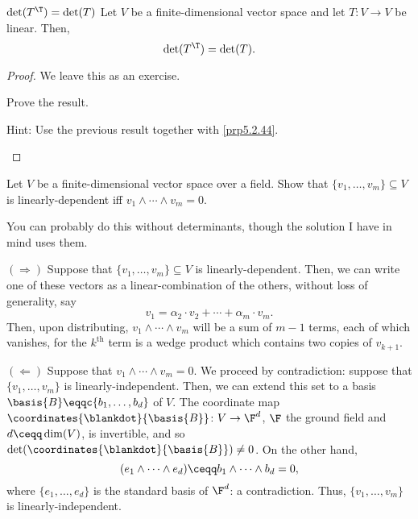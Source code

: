 \begin{crl}{$\det (T^{\T})=\det (T)$}{}
	Let $V$ be a finite-dimensional vector space and let $T\colon V\rightarrow V$ be linear.  Then,
	\begin{equation}
		\det (T^{\T})=\det (T).
	\end{equation}
	\begin{proof}
		We leave this as an exercise.
		\begin{exr}[breakable=false]{}{}
			Prove the result.
			\begin{rmk}
				Hint:  Use the previous result together with \cref{prp5.2.44}.
			\end{rmk}
		\end{exr}
	\end{proof}
\end{crl}

\begin{exr}{}{}
	Let $V$ be a finite-dimensional vector space over a field.
	Show that $\{ v_1,\ldots ,v_m\} \subseteq V$ is linearly-dependent iff $v_1\wedge \cdots \wedge v_m=0$.
	\begin{rmk}
		You can probably do this without determinants, though the solution I have in mind uses them.
	\end{rmk}
	\begin{solution}
		$(\Rightarrow )$ Suppose that $\{ v_1,\ldots ,v_m\} \subseteq V$ is linearly-dependent.  Then, we can write one of these vectors as a linear-combination of the others, without loss of generality, say
		\begin{equation}
		v_1=\alpha _2\cdot v_2+\cdots +\alpha _m\cdot v_m.
		\end{equation}
		Then, upon distributing, $v_1\wedge \cdots \wedge v_m$ will be a sum of $m-1$ terms, each of which vanishes, for the $k^{\text{th}}$ term is a wedge product which contains two copies of $v_{k+1}$.
		
		\blni
		$(\Leftarrow )$ Suppose that $v_1\wedge \cdots \wedge v_m=0$.  We proceed by contradiction:  suppose that $\{ v_1,\ldots ,v_m\}$ is linearly-independent.  Then, we can extend this set to a basis $\basis{B}\eqqc \{ b_1,\ldots ,b_d\}$ of $V$.  The coordinate map $\coordinates{\blankdot}{\basis{B}}\colon V\rightarrow \F ^d$, $\F$ the ground field and $d\ceqq \dim (V)$, is invertible, and so $\det (\coordinates{\blankdot}{\basis{B}})\neq 0$.  On the other hand,
		\begin{equation}
		[\antialg* ^d\coordinates{\blankdot}{\basis{B}}^{-1}](e_1\wedge \cdots \wedge e_d)\ceqq b_1\wedge \cdots \wedge b_d=0,
		\end{equation}
		where $\{ e_1,\ldots ,e_d\}$ is the standard basis of $\F ^d$:  a contradiction.  Thus, $\{ v_1,\ldots ,v_m\}$ is linearly-independent.
	\end{solution}
\end{exr}

